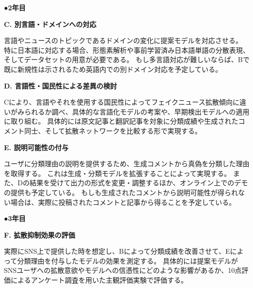 {	%


	\noindent
	●\textbf{2年目}

	\noindent
	\textbf{C. 別言語・ドメインへの対応}

	言語やニュースのトピックであるドメインの変化に提案モデルを対応させる。
	特に日本語に対応する場合、形態素解析や事前学習済み日本語単語の分散表現、そしてデータセットの用意が必要である。
	もし多言語対応が難しいならば、Bで既に新規性は示されるため英語内での別ドメイン対応を予定している。

	\noindent
	\textbf{D. 言語性・国民性による差異の検討}

	Cにより、言語やそれを使用する国民性によってフェイクニュース拡散傾向に違いがみられるか調べ、具体的な⾔語化モデルの考案や、早期検出モデルへの適⽤に取り組む。
	具体的には原文記事と翻訳記事を対象に分類成績や生成されたコメント同士、そして拡散ネットワークを比較する形で実現する。

	\noindent
	\textbf{E. 説明可能性の付与}

	ユーザに分類理由の説明を提供するため、生成コメントから真偽を分類した理由を取得する。
	これは生成・分類モデルを拡張することによって実現する。
	また、Dの結果を受けて出力の形式を変更・調整するほか、オンライン上でのデモの提供も予定している。
	もしも生成されたコメントから説明可能性が得られない場合は、実際に投稿されたコメントと記事から得ることを予定している。

	\noindent
	●\textbf{3年目}

	\noindent
	\textbf{F. 拡散抑制効果の評価}

	実際にSNS上で提供した時を想定し、Bによって分類成績を改善させて、Eによって分類理由を付与したモデルの効果を測定する。
	具体的には提案モデルがSNSユーザへの拡散意欲やモデルへの信憑性にどのような影響があるか、10点評価によるアンケート調査を用いた主観評価実験で評価する。

}

